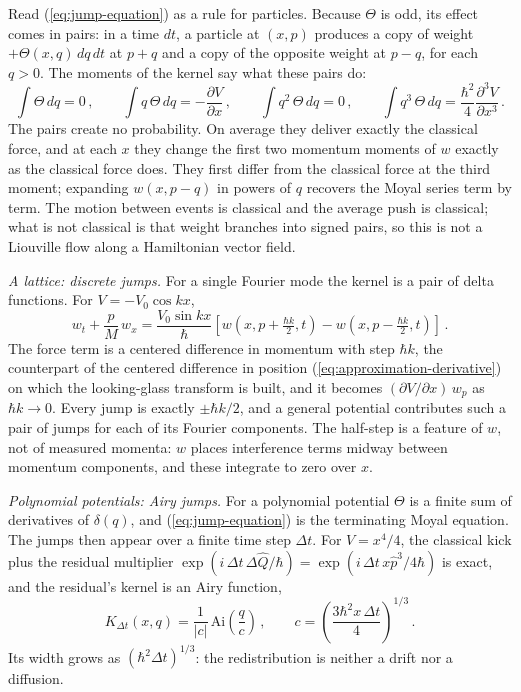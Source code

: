 \documentclass[12pt]{article}
\begin{document}
Read (\ref{eq:jump-equation}) as a rule for particles.  Because $\Theta$ is odd, its effect comes in pairs: in a time $dt$, a particle at $(x,p)$ produces a copy of weight $+\Theta(x,q)\,dq\,dt$ at $p+q$ and a copy of the opposite weight at $p-q$, for each $q > 0$.  The moments of the kernel say what these pairs do:
\begin{equation}\label{eq:jump-moments}
\int \Theta\, dq = 0 \,, \qquad
\int q\,\Theta\, dq = -\frac{\partial V}{\partial x} \,, \qquad
\int q^2\,\Theta\, dq = 0 \,, \qquad
\int q^3\,\Theta\, dq = \frac{\hbar^2}{4}\frac{\partial^3 V}{\partial x^3} \,.
\end{equation}
The pairs create no probability.  On average they deliver exactly the classical force, and at each $x$ they change the first two momentum moments of $w$ exactly as the classical force does.  They first differ from the classical force at the third moment; expanding $w(x,p-q)$ in powers of $q$ recovers the Moyal series \cite{moyal1949} term by term.  The motion between events is classical and the average push is classical; what is not classical is that weight branches into signed pairs, so this is not a Liouville flow along a Hamiltonian vector field.

\textit{A lattice: discrete jumps.}  For a single Fourier mode the kernel is a pair of delta functions.  For $V = -V_0 \cos kx$,
\begin{equation}\label{eq:jump-lattice}
w_t + \frac{p}{M}\,w_x = \frac{V_0 \sin kx}{\hbar}\left[ w\!\left(x,p+\tfrac{\hbar k}{2},t\right) - w\!\left(x,p-\tfrac{\hbar k}{2},t\right) \right] \,.
\end{equation}
The force term is a centered difference in momentum with step $\hbar k$, the counterpart of the centered difference in position (\ref{eq:approximation-derivative}) on which the looking-glass transform is built, and it becomes $(\partial V/\partial x)\,w_p$ as $\hbar k \rightarrow 0$.  Every jump is exactly $\pm\hbar k/2$, and a general potential contributes such a pair of jumps for each of its Fourier components.  The half-step is a feature of $w$, not of measured momenta: $w$ places interference terms midway between momentum components, and these integrate to zero over $x$.

\textit{Polynomial potentials: Airy jumps.}  For a polynomial potential $\Theta$ is a finite sum of derivatives of $\delta(q)$, and (\ref{eq:jump-equation}) is the terminating Moyal equation.  The jumps then appear over a finite time step $\Delta t$.  For $V = x^4/4$, the classical kick plus the residual multiplier $\exp(i\,\Delta t\,\Delta\hat{Q}/\hbar) = \exp(i\,\Delta t\, x\hat{p}^3/4\hbar)$ is exact, and the residual's kernel is an Airy function,
\begin{equation}\label{eq:jump-airy}
K_{\Delta t}(x,q) = \frac{1}{|c|}\,\mathrm{Ai}\!\left(\frac{q}{c}\right) \,, \qquad c = \left(\frac{3\hbar^2 x\, \Delta t}{4}\right)^{1/3} \,.
\end{equation}
Its width grows as $(\hbar^2\Delta t)^{1/3}$: the redistribution is neither a drift nor a diffusion.
\end{document}
